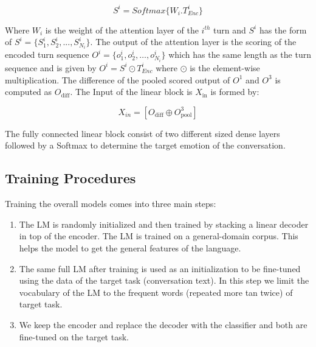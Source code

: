 \documentclass{article}
\begin{document}
\begin{equation}
    S^i=Softmax \{W_i.T_{Enc}^i\}
\end{equation}

Where $W_i$ is the weight of the attention layer of the $i^{th}$ turn and $S^i$ has the form of $S^i = \{S_1^i,S_2^i, ..., S_{N_i}^i\}$. The output of the attention layer is the scoring of the encoded turn sequence $O^i=\{o_1^i,o_2^i,\dots ,o_{N_i}^i\}$ which has the same length as the turn sequence and is given by $O^i = S^i \odot T_{Enc}^i$
where $\odot$ is the element-wise multiplication. The difference of the pooled scored output of $O^1$ and $O^3$ is computed as $O_{\text{diff}}$. The Input of the linear block is $X_{\text{in}}$ is formed by:

\begin{equation}
    X_{in} = [O_{\text{diff}} \oplus O_{\text{pool}}^3]
\end{equation}

The fully connected linear block consist of two different sized dense layers followed by a Softmax to determine the target emotion of the conversation. 

\subsection{Training Procedures}
Training the overall models comes into three main steps:
\begin{enumerate}
\item The LM is randomly initialized and then trained by stacking a linear decoder in top of the encoder. The LM is trained on a general-domain corpus. This helps the model to get the general features of the language.
\item The same full LM after training is used as an initialization to be fine-tuned using the data of the target task (conversation text). In this step we limit the vocabulary of the LM to the frequent words (repeated more tan twice) of target task.
\item We keep the encoder and replace the decoder with the classifier and both are fine-tuned on the target task.\end{enumerate}
\end{document}
